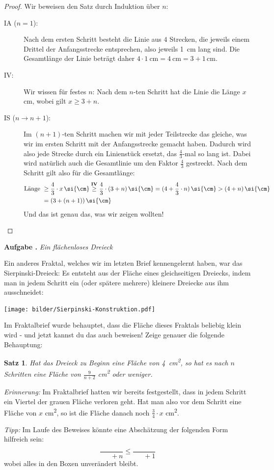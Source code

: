 \documentclass[a4paper,ngerman,12pt]{scrartcl}
\theoremstyle{definition}
\theoremstyle{plain}
\newtheorem{satz}[defn]{Satz}
\theoremstyle{remark}
\newlength{\aufgabenskip}
\newcounter{aufgabennummer}
\newenvironment{aufgabe}[1]{
	\refstepcounter{aufgabennummer}
	\textbf{Aufgabe \theaufgabennummer.} \emph{#1} \par
}{\vspace{\aufgabenskip}}
\begin{document}
\begin{proof}
	Wir beweisen den Satz durch Induktion über $n$:
	\begin{description}
		\item[IA ($n=1$):] Nach dem ersten Schritt besteht die Linie aus $4$ Strecken, die jeweils einem Drittel der Anfangsstrecke entsprechen, also jeweils \SI{1}{\cm} lang sind. Die Gesamtlänge der Linie beträgt daher $4 \cdot \SI{1}{\cm} = \SI{4}{\cm} = 3+1\,\si{\cm}$.
		\item[IV:] Wir wissen für festes $n$: Nach dem $n$-ten Schritt hat die Linie die Länge $x$ \si{\cm}, wobei gilt $x \geq 3+n$.
		\item[IS ($n\to n+1$):] Im $(n+1)$-ten Schritt machen wir mit jeder Teilstrecke das gleiche, was wir im ersten Schritt mit der Anfangsstrecke gemacht haben. Dadurch wird also jede Strecke durch ein Linienstück ersetzt, das $\frac{4}{3}$-mal so lang ist. Dabei wird natürlich auch die Gesamtlinie um den Faktor $\frac{4}{3}$ gestreckt. Nach dem Schritt gilt also für die Gesamtlänge:
			\begin{align*}
			\text{Länge } 	&\geq \frac{4}{3}\cdot x\,\si{\cm} \overset{\text{\textbf{IV}}}{\geq} \frac{4}{3}\cdot (3+n)\,\si{\cm} = (4+\frac{4}{3}\cdot n)\,\si{\cm} > (4+ n)\,\si{\cm} \\
							&= (3+ (n+1))\,\si{\cm}
			\end{align*}
		Und das ist genau das, was wir zeigen wollten!
	\end{description}
\end{proof}

\begin{aufgabe}{Ein flächenloses Dreieck}
	Ein anderes Fraktal, welches wir im letzten Brief kennengelernt haben, war das Sierpinski-Dreieck: Es entsteht aus der Fläche eines gleichseitigen Dreiecks, indem man in jedem Schritt ein (oder spätere mehrere) kleinere Dreiecke aus ihm ausschneidet:
	\begin{center}
		\texttt{[image: bilder/Sierpinski-Konstruktion.pdf]}
	\end{center}
	Im Fraktalbrief wurde behauptet, dass die Fläche dieses Fraktals beliebig klein wird - und jetzt kannst du das auch beweisen! Zeige genauer die folgende Behauptung:
	\begin{satz}
		Hat das Dreieck zu Beginn eine Fläche von \SI{4}{\cm\squared}, so hat es nach $n$ Schritten eine Fläche von $\frac{9}{n+2}$ \si{\cm\squared} oder weniger.
	\end{satz}
	\emph{Erinnerung:} Im Fraktalbrief hatten wir bereits festgestellt, dass in jedem Schritt ein Viertel der grauen Fläche verloren geht. Hat man also vor dem Schritt eine Fläche von $x$ \si{\cm\squared}, so ist die Fläche danach noch $\frac{3}{4}\cdot x$ \si{\cm\squared}.
	
	\emph{Tipp:} Im Laufe des Beweises könnte eine Abschätzung der folgenden Form hilfreich sein: 
		\[\frac{\boxed{\phantom{123}}}{\boxed{\phantom{123}} + n} \leq \frac{\boxed{\phantom{123}}}{\boxed{\phantom{123}} + 1} \]
	wobei alles in den Boxen unverändert bleibt.
\end{aufgabe}
\end{document}
